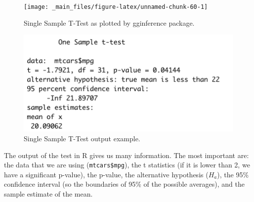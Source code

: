 \documentclass[
]{svmono}
\newenvironment{Shaded}{\begin{snugshade}}{\end{snugshade}}
\newcommand{\AttributeTok}[1]{\textcolor[rgb]{0.13,0.29,0.53}{#1}}
\newcommand{\CommentTok}[1]{\textcolor[rgb]{0.56,0.35,0.01}{\textit{#1}}}
\newcommand{\DecValTok}[1]{\textcolor[rgb]{0.00,0.00,0.81}{#1}}
\newcommand{\FunctionTok}[1]{\textcolor[rgb]{0.13,0.29,0.53}{\textbf{#1}}}
\newcommand{\NormalTok}[1]{#1}
\newcommand{\SpecialCharTok}[1]{\textcolor[rgb]{0.81,0.36,0.00}{\textbf{#1}}}
\newcommand{\StringTok}[1]{\textcolor[rgb]{0.31,0.60,0.02}{#1}}
\begin{document}
\begin{Shaded}
\end{Shaded}

\begin{figure}[H]

{\centering \texttt{[image: \_main\_files/figure-latex/unnamed-chunk-60-1]} 

}

\caption{Single Sample T-Test as plotted by gginference package.}\label{fig:unnamed-chunk-60}
\end{figure}

\begin{figure}[H]

{\centering \includegraphics[width=0.5\linewidth,]{images/Schermata 2022-03-29 alle 16.14.37} 

}

\caption{Single Sample T-Test output example.}\label{fig:unnamed-chunk-61}
\end{figure}

The output of the test in R gives us many information. The most
important are: the data that we are using (\texttt{mtcars\$mpg}), the t
statistics (if it is lower than 2, we have a significant p-value), the
p-value, the alternative hypothesis (\(H_a\)), the 95\% confidence interval
(so the boundaries of 95\% of the possible averages), and the sample
estimate of the mean.
\end{document}
